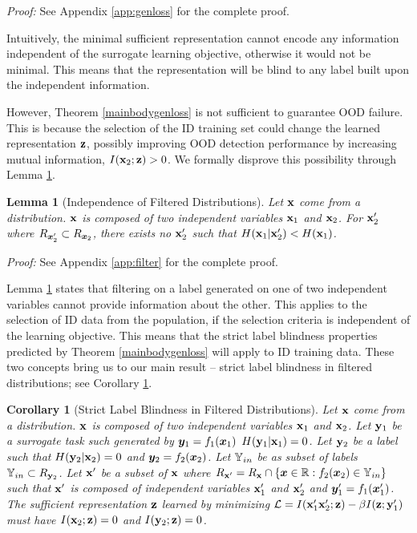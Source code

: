 \documentclass[11pt, oneside]{book}
\theoremstyle{plain}
\newtheorem{lemma}[theorem]{Lemma}
\newtheorem{corollary}[theorem]{Corollary}
\theoremstyle{definition}
\theoremstyle{remark}
\begin{document}
\textit{Proof:} See Appendix \ref{app:genloss} for the complete proof.

Intuitively, the minimal sufficient representation cannot encode any information independent of the surrogate learning objective, otherwise it would not be minimal. This means that the representation will be blind to any label built upon the independent information.

However, Theorem \ref{mainbodygenloss} is not sufficient to guarantee OOD failure. This is because the selection of the ID training set could change the learned representation ${\mathbf{z}}$, possibly improving OOD detection performance by increasing mutual information, $I({\mathbf{x}}_2;{\mathbf{z}}) > 0$. We formally disprove this possibility through Lemma \ref{mainbodyfilter}.

\begin{lemma}[Independence of Filtered Distributions]
    Let ${\mathbf{x}}$ come from a distribution. ${\mathbf{x}}$ is composed of two independent variables ${\mathbf{x}}_1$ and ${\mathbf{x}}_2$. For ${\mathbf{x}}_2'$ where $R_{{\bm{x}}_2'} \subset R_{{\bm{x}}_2}$, there exists no ${\mathbf{x}}_2'$ such that $H({\mathbf{x}}_1|{\mathbf{x}}_2') < H({\mathbf{x}}_1)$.
    \label{mainbodyfilter}
\end{lemma}

\textit{Proof:} See Appendix \ref{app:filter} for the complete proof.

Lemma \ref{mainbodyfilter} states that filtering on a label generated on one of two independent variables cannot provide information about the other. This applies to the selection of ID data from the population, if the selection criteria is independent of the learning objective. This means that the strict label blindness properties predicted by Theorem \ref{mainbodygenloss} will apply to ID training data. These two concepts bring us to our main result -- strict label blindness in filtered distributions; see Corollary \ref{mainbodyfailood}.

\begin{corollary}[Strict Label Blindness in Filtered Distributions]
    Let ${\mathbf{x}}$ come from a distribution. ${\mathbf{x}}$ is composed of two independent variables ${\mathbf{x}}_1$ and ${\mathbf{x}}_2$. Let ${\mathbf{y}}_1$ be a surrogate task such generated by ${\bm{y}}_1 = f_1({\bm{x}}_1)$ $H({\mathbf{y}}_1|{\mathbf{x}}_1) = 0$. Let ${\mathbf{y}}_2$ be a label such that $H({\mathbf{y}}_2|{\mathbf{x}}_2) = 0$ and ${\bm{y}}_2 = f_2({\bm{x}}_2)$. Let ${\mathbb{Y}}_{in}$ be as subset of labels ${\mathbb{Y}}_{in} \subset R_{{\mathbf{y}}_2}$. Let ${\mathbf{x}}'$ be a subset of ${\mathbf{x}}$ where $R_{{\mathbf{x}}'} = R_{{\mathbf{x}}} \cap \{{\bm{x}} \in \mathbb{R}: f_2({\bm{x}}_2) \in {\mathbb{Y}}_{in} \}$ such that ${\mathbf{x}}'$ is composed of independent variables ${\mathbf{x}}_1'$ and ${\mathbf{x}}_2'$ and ${\bm{y}}_1' = f_1({\bm{x}}_1')$. The sufficient representation ${\mathbf{z}}$ learned by minimizing $\mathcal{L} = I({\mathbf{x}}_1' {\mathbf{x}}_2'; {\mathbf{z}}) - \beta I({\mathbf{z}};{\mathbf{y}}_1')$ must have $I({\mathbf{x}}_2;{\mathbf{z}}) = 0$ and $I({\mathbf{y}}_2;{\mathbf{z}}) = 0$.
    \label{mainbodyfailood}
\end{corollary}
\end{document}
